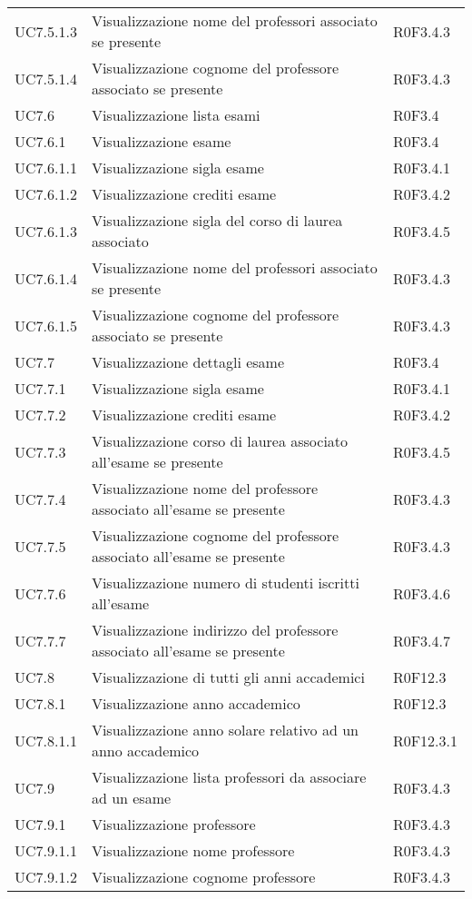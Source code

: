 \documentclass[AnalisiDeiRequisiti.tex]{subfiles}
\begin{document}
\begin{longtable}[H]{p{2cm}p{5cm}p{5cm}}
	UC7.5.1.3 & Visualizzazione nome del professori associato se presente & R0F3.4.3 \\
	UC7.5.1.4 & Visualizzazione cognome del professore associato se presente & R0F3.4.3 \\
	UC7.6 & Visualizzazione lista esami & R0F3.4 \\
	UC7.6.1 & Visualizzazione esame & R0F3.4 \\
	UC7.6.1.1 & Visualizzazione sigla esame & R0F3.4.1 \\
	UC7.6.1.2 & Visualizzazione crediti esame & R0F3.4.2 \\
	UC7.6.1.3 & Visualizzazione sigla del corso di laurea associato & R0F3.4.5 \\
	UC7.6.1.4 & Visualizzazione nome del professori associato se presente & R0F3.4.3 \\
	UC7.6.1.5 & Visualizzazione cognome del professore associato se presente & R0F3.4.3 \\
	UC7.7 & Visualizzazione dettagli esame & R0F3.4 \\
	UC7.7.1 & Visualizzazione sigla esame & R0F3.4.1 \\
	UC7.7.2 & Visualizzazione crediti esame & R0F3.4.2 \\
	UC7.7.3 & Visualizzazione corso di laurea associato all'esame se presente & R0F3.4.5 \\
	UC7.7.4 & Visualizzazione nome del professore associato all'esame se presente & R0F3.4.3 \\
	UC7.7.5 & Visualizzazione cognome del professore associato all'esame se presente & R0F3.4.3 \\
	UC7.7.6 & Visualizzazione numero di studenti iscritti all'esame & R0F3.4.6 \\
	UC7.7.7 & Visualizzazione indirizzo del professore associato all'esame se presente & R0F3.4.7 \\
	UC7.8 & Visualizzazione di tutti gli anni accademici & R0F12.3 \\
	UC7.8.1 & Visualizzazione anno accademico & R0F12.3 \\
	UC7.8.1.1 & Visualizzazione anno solare relativo ad un anno accademico & R0F12.3.1 \\
	UC7.9 & Visualizzazione lista professori da associare ad un esame & R0F3.4.3 \\
	UC7.9.1 & Visualizzazione professore & R0F3.4.3 \\
	UC7.9.1.1 & Visualizzazione nome professore & R0F3.4.3 \\
	UC7.9.1.2 & Visualizzazione cognome professore & R0F3.4.3 \\

\end{longtable}
\end{document}
